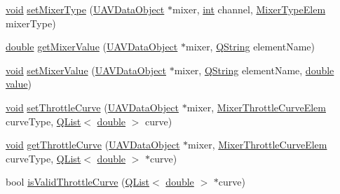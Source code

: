 \begin{DoxyCompactItemize}
\item 
\hyperlink{group___u_a_v_objects_plugin_ga444cf2ff3f0ecbe028adce838d373f5c}{void} \hyperlink{group___config_plugin_ga060909ce68f927e2b3f6d7b14d36a3b8}{set\-Mixer\-Type} (\hyperlink{class_u_a_v_data_object}{U\-A\-V\-Data\-Object} $\ast$mixer, \hyperlink{ioapi_8h_a787fa3cf048117ba7123753c1e74fcd6}{int} channel, \hyperlink{group___config_plugin_ga28ebdbd14bc688c9a87376caeffd32e9}{Mixer\-Type\-Elem} mixer\-Type)
\item 
\hyperlink{_super_l_u_support_8h_a8956b2b9f49bf918deed98379d159ca7}{double} \hyperlink{group___config_plugin_ga4043ba19db9003bbebdc196ccc54bc72}{get\-Mixer\-Value} (\hyperlink{class_u_a_v_data_object}{U\-A\-V\-Data\-Object} $\ast$mixer, \hyperlink{group___u_a_v_objects_plugin_gab9d252f49c333c94a72f97ce3105a32d}{Q\-String} element\-Name)
\item 
\hyperlink{group___u_a_v_objects_plugin_ga444cf2ff3f0ecbe028adce838d373f5c}{void} \hyperlink{group___config_plugin_ga7f2b470b423569fa6b07c81e21288e28}{set\-Mixer\-Value} (\hyperlink{class_u_a_v_data_object}{U\-A\-V\-Data\-Object} $\ast$mixer, \hyperlink{group___u_a_v_objects_plugin_gab9d252f49c333c94a72f97ce3105a32d}{Q\-String} element\-Name, \hyperlink{_super_l_u_support_8h_a8956b2b9f49bf918deed98379d159ca7}{double} \hyperlink{glext_8h_aa0e2e9cea7f208d28acda0480144beb0}{value})
\item 
\hyperlink{group___u_a_v_objects_plugin_ga444cf2ff3f0ecbe028adce838d373f5c}{void} \hyperlink{group___config_plugin_gaa0e88bc5f48d30ef5c1ef359ab2803ee}{set\-Throttle\-Curve} (\hyperlink{class_u_a_v_data_object}{U\-A\-V\-Data\-Object} $\ast$mixer, \hyperlink{group___config_plugin_gade5fe5fce28e87dce288d08dcf87a101}{Mixer\-Throttle\-Curve\-Elem} curve\-Type, \hyperlink{class_q_list}{Q\-List}$<$ \hyperlink{_super_l_u_support_8h_a8956b2b9f49bf918deed98379d159ca7}{double} $>$ curve)
\item 
\hyperlink{group___u_a_v_objects_plugin_ga444cf2ff3f0ecbe028adce838d373f5c}{void} \hyperlink{group___config_plugin_ga281f6c86ad38eaab7bb5722f91ea2242}{get\-Throttle\-Curve} (\hyperlink{class_u_a_v_data_object}{U\-A\-V\-Data\-Object} $\ast$mixer, \hyperlink{group___config_plugin_gade5fe5fce28e87dce288d08dcf87a101}{Mixer\-Throttle\-Curve\-Elem} curve\-Type, \hyperlink{class_q_list}{Q\-List}$<$ \hyperlink{_super_l_u_support_8h_a8956b2b9f49bf918deed98379d159ca7}{double} $>$ $\ast$curve)
\item 
bool \hyperlink{group___config_plugin_ga92da8cda852e8b2f1974cac57fbaa99f}{is\-Valid\-Throttle\-Curve} (\hyperlink{class_q_list}{Q\-List}$<$ \hyperlink{_super_l_u_support_8h_a8956b2b9f49bf918deed98379d159ca7}{double} $>$ $\ast$curve)

\end{DoxyCompactItemize}
